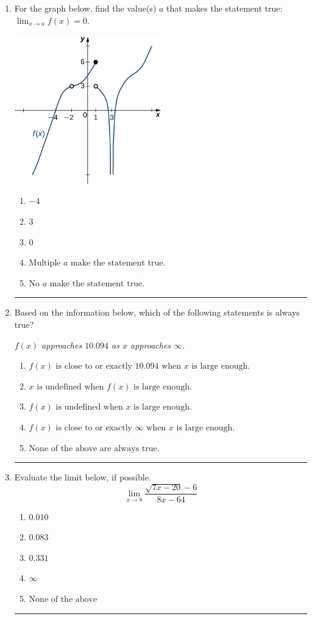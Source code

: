 \documentclass[14pt]{extbook}
\newcommand{\litem}[1]{\item#1\hspace*{-1cm}\rule{\textwidth}{0.4pt}}
\begin{document}
\begin{enumerate}
{\begin{enumerate}[label=\Alph*.]
\end{enumerate} }
\litem{
For the graph below, find the value(s) $a$ that makes the statement true: $ \displaystyle \lim_{x \rightarrow a} f(x) = 0$.
\begin{center}
    \includegraphics[width=0.5\textwidth]{../Figures/evaluateLimitGraphicallyA.png}
\end{center}
\begin{enumerate}[label=\Alph*.]
\item \( -4 \)
\item \( 3 \)
\item \( 0 \)
\item \( \text{Multiple } a \text{ make the statement true}. \)
\item \( \text{No } a \text{ make the statement true}. \)

\end{enumerate} }
\litem{
Based on the information below, which of the following statements is always true?
\begin{center}
    \textit{ $f(x)$ approaches $10.094$ as $x$ approaches $\infty$. }
\end{center}
\begin{enumerate}[label=\Alph*.]
\item \( f(x) \text{ is close to or exactly } 10.094 \text{ when } x \text{ is large enough}. \)
\item \( x \text{ is undefined when } f(x) \text{ is large enough}. \)
\item \( f(x) \text{ is undefined when } x \text{ is large enough}. \)
\item \( f(x) \text{ is close to or exactly } \infty \text{ when } x \text{ is large enough}. \)
\item \( \text{None of the above are always true.} \)

\end{enumerate} }
\litem{
Evaluate the limit below, if possible.\[ \lim_{x \rightarrow 8} \frac{\sqrt{7x - 20} - 6}{8x - 64} \]\begin{enumerate}[label=\Alph*.]
\item \( 0.010 \)
\item \( 0.083 \)
\item \( 0.331 \)
\item \( \infty \)
\item \( \text{None of the above} \)


\end{enumerate}}
\end{enumerate}
\end{document}
